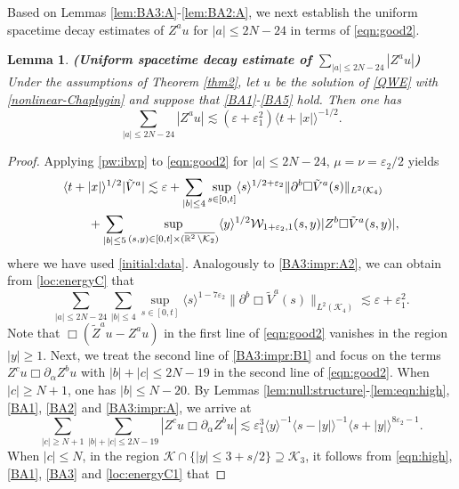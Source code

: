 \documentclass[11pt,twoside]{article}
\def\cK{\mathcal K}
\def\cW{\mathcal W}
\def\R{\mathop{\mathbb R\kern 0pt}\nolimits}
\def\ds{\displaystyle}
\def\p{\partial}
\def\ve{\varepsilon}
\def\ls{\lesssim}
\newcommand{\w}[1]{\langle {#1} \rangle}
\theoremstyle{plain}
\newtheorem{lemma}[theorem]{Lemma}
\theoremstyle{definition}
\numberwithin{equation}{section}
\begin{document}
Based on Lemmas \ref{lem:BA3:A}-\ref{lem:BA2:A}, we next establish the uniform spacetime decay estimates
of $Z^au$ for $|a|\le2N-24$ in terms of \eqref{eqn:good2}.
\begin{lemma}\label{YHCC-52}
{\bf (Uniform spacetime decay estimate of $\ds\sum_{|a|\le2N-24}|Z^au|$)}
Under the assumptions of Theorem \ref{thm2}, let $u$ be the solution of \eqref{QWE} with \eqref{nonlinear-Chaplygin}
and suppose that \eqref{BA1}-\eqref{BA5} hold.
Then one has
\begin{equation}\label{BA3:impr:B}
\sum_{|a|\le2N-24}|Z^au|\ls(\ve+\ve_1^2)\w{t+|x|}^{-1/2}.
\end{equation}
\end{lemma}
\begin{proof}
Applying \eqref{pw:ibvp} to \eqref{eqn:good2} for $|a|\le2N-24$, $\mu=\nu=\ve_2/2$ yields
\begin{equation}\label{BA3:impr:B1}
\begin{split}
&\w{t+|x|}^{1/2}|\tilde V^a|\ls\ve+\sum_{|b|\le4}\sup_{s\in[0,t]}\w{s}^{1/2+\ve_2}\|\p^b\Box\tilde V^a(s)\|_{L^2(\cK_4)}\\
&\qquad+\sum_{|b|\le5}\sup_{(s,y)\in[0,t]\times(\overline{\R^2\setminus\cK_2})}\w{y}^{1/2}\cW_{1+\ve_2,1}(s,y)|Z^b\Box\tilde V^a(s,y)|,
\end{split}
\end{equation}
where we have used \eqref{initial:data}.
Analogously to \eqref{BA3:impr:A2}, we can obtain from \eqref{loc:energyC} that
\begin{equation}\label{BA3:impr:B2}
\sum_{|a|\le2N-24}\sum_{|b|\le4}\sup_{s\in[0,t]}\w{s}^{1-7\ve_2}\|\p^b\Box\tilde V^a(s)\|_{L^2(\cK_4)}\ls\ve+\ve_1^2.
\end{equation}
Note that $\Box(\tilde Z^au-Z^au)$ in the first line of \eqref{eqn:good2} vanishes in the region $|y|\ge1$.
Next, we treat the second line of \eqref{BA3:impr:B1} and focus on the terms $Z^cu\Box\p_{\alpha}Z^bu$ with $|b|+|c|\le2N-19$
in the second line of \eqref{eqn:good2}.
When $|c|\ge N+1$, one has $|b|\le N-20$.
By Lemmas \ref{lem:null:structure}-\ref{lem:eqn:high}, \eqref{BA1}, \eqref{BA2} and \eqref{BA3:impr:A}, we arrive at
\begin{equation}\label{BA3:impr:B3}
\sum_{|c|\ge N+1}\sum_{|b|+|c|\le2N-19}|Z^cu\Box\p_{\alpha}Z^bu|\ls\ve_1^3\w{y}^{-1}\w{s-|y|}^{-1}\w{s+|y|}^{8\ve_2-1}.
\end{equation}
When $|c|\le N$, in the region $\cK\cap\{|y|\le3+s/2\}\supseteq{\cK}_3$, it follows from \eqref{eqn:high}, \eqref{BA1}, \eqref{BA3} and \eqref{loc:energyC1} that

\end{proof}
\end{document}
